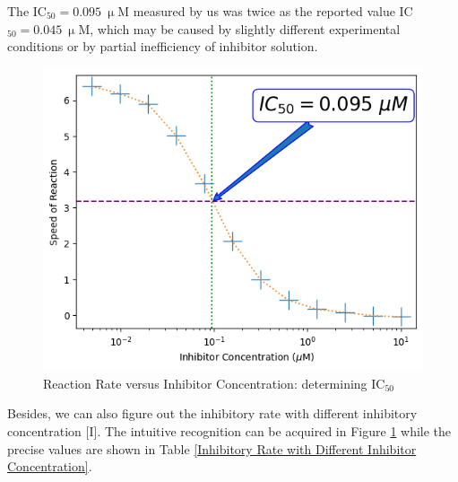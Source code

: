 \documentclass{report}
\begin{document}
The IC$_{50}=0.095\ \upmu \text{M}$ measured by us was twice as the reported value IC$_{50}=0.045\ \upmu \text{M}$, which may be caused by slightly different experimental conditions or by partial inefficiency of inhibitor solution.
\begin{figure}
    \centering
    \includegraphics[width=1\linewidth]{../Figures/inhibitor2.png}
    \caption{Reaction Rate versus Inhibitor Concentration: determining $\text{IC}_{50}$}
    \label{Reaction Rate versus Inhibitor Concentration: determining IC50}
\end{figure}

Besides, we can also figure out the inhibitory rate with different inhibitory concentration [I].
The intuitive recognition can be acquired in Figure \ref{Reaction Rate versus Inhibitor Concentration: determining IC50} while the precise values are shown in Table \ref{Inhibitory Rate with Different Inhibitor Concentration}.
\end{document}

